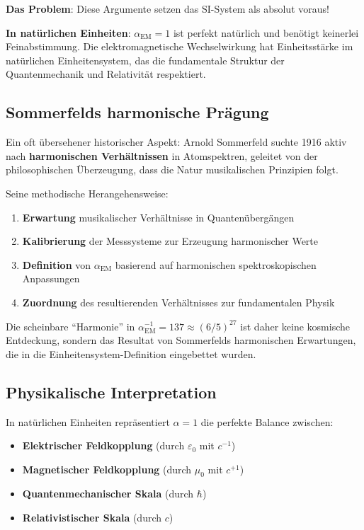 \textbf{Das Problem}: Diese Argumente setzen das SI-System als absolut voraus!

\textbf{In natürlichen Einheiten}: $\alpha_{\text{EM}} = 1$ ist perfekt natürlich und benötigt keinerlei Feinabstimmung. Die elektromagnetische Wechselwirkung hat Einheitsstärke im natürlichen Einheitensystem, das die fundamentale Struktur der Quantenmechanik und Relativität respektiert.

\subsection{Sommerfelds harmonische Prägung}
\label{subsec:sommerfeld_harmonic}

Ein oft übersehener historischer Aspekt: Arnold Sommerfeld suchte 1916 aktiv nach \textbf{harmonischen Verhältnissen} in Atomspektren, geleitet von der philosophischen Überzeugung, dass die Natur musikalischen Prinzipien folgt.

Seine methodische Herangehensweise:
\begin{enumerate}
	\item \textbf{Erwartung} musikalischer Verhältnisse in Quantenübergängen
	\item \textbf{Kalibrierung} der Messsysteme zur Erzeugung harmonischer Werte
	\item \textbf{Definition} von $\alpha_{\text{EM}}$ basierend auf harmonischen spektroskopischen Anpassungen
	\item \textbf{Zuordnung} des resultierenden Verhältnisses zur fundamentalen Physik
\end{enumerate}

Die scheinbare ``Harmonie'' in $\alpha_{\text{EM}}^{-1} = 137 \approx (6/5)^{27}$ ist daher keine kosmische Entdeckung, sondern das Resultat von Sommerfelds harmonischen Erwartungen, die in die Einheitensystem-Definition eingebettet wurden.

\subsection{Physikalische Interpretation}
\label{subsec:physical_interpretation}

In natürlichen Einheiten repräsentiert $\alpha = 1$ die perfekte Balance zwischen:

\begin{itemize}
	\item \textbf{Elektrischer Feldkopplung} (durch $\varepsilon_0$ mit $c^{-1}$)
	\item \textbf{Magnetischer Feldkopplung} (durch $\mu_0$ mit $c^{+1}$)
	\item \textbf{Quantenmechanischer Skala} (durch $\hbar$)
	\item \textbf{Relativistischer Skala} (durch $c$)
\end{itemize}

